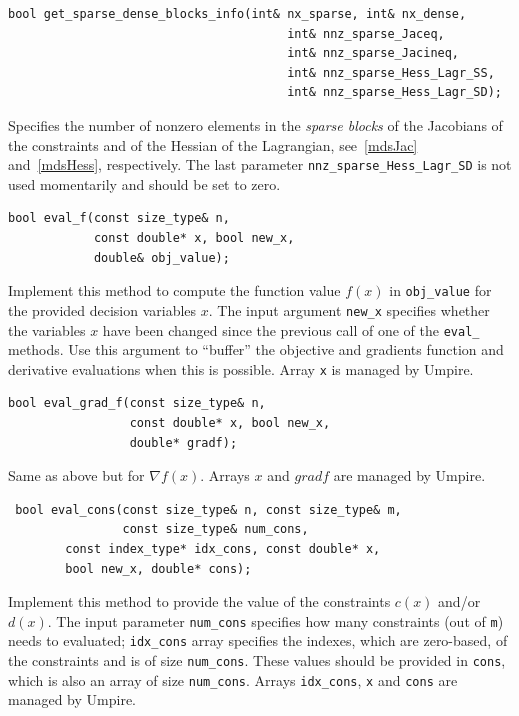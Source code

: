 \documentclass[11pt]{article}
\begin{document}
\begin{lstlisting} 
bool get_sparse_dense_blocks_info(int& nx_sparse, int& nx_dense,
					                   int& nnz_sparse_Jaceq, 
					                   int& nnz_sparse_Jacineq,
					                   int& nnz_sparse_Hess_Lagr_SS, 
					                   int& nnz_sparse_Hess_Lagr_SD);
\end{lstlisting}
\noindent Specifies the number of nonzero elements in the  \textit{sparse blocks} of the Jacobians of the constraints and of the Hessian of the Lagrangian, see~\eqref{mdsJac} and~\eqref{mdsHess}, respectively. The last parameter \texttt{nnz\_sparse\_Hess\_Lagr\_SD} is not used momentarily and should be set to zero.

\begin{lstlisting} 
bool eval_f(const size_type& n, 
            const double* x, bool new_x, 
            double& obj_value);
\end{lstlisting} 

\noindent Implement this method to compute the function value $f(x)$ in \texttt{obj\_value} for the provided decision variables $x$. The input argument \texttt{new\_x} specifies whether the variables $x$ have been changed since the previous call of one of the \texttt{eval\_} methods. Use this argument to ``buffer'' the objective and gradients function and derivative evaluations when this is possible. Array \texttt{x} is managed by Umpire.

\begin{lstlisting} 
bool eval_grad_f(const size_type& n, 
                 const double* x, bool new_x, 
                 double* gradf);
\end{lstlisting} 

\noindent Same as above but for $\nabla f(x)$. Arrays $x$ and $gradf$ are managed by Umpire.

\begin{lstlisting} 
 bool eval_cons(const size_type& n, const size_type& m, 
                const size_type& num_cons,
		const index_type* idx_cons, const double* x, 
		bool new_x, double* cons);
\end{lstlisting} 

\noindent Implement this method to provide the value of the constraints $c(x)$ and/or $d(x)$. The input parameter \texttt{num\_cons} specifies how many constraints (out of \texttt{m}) needs to evaluated; \texttt{idx\_cons} array specifies the indexes, which are zero-based, of the constraints  and is of size \texttt{num\_cons}. These values should be provided in \texttt{cons}, which is also an array of size \texttt{num\_cons}. Arrays \texttt{idx\_cons}, \texttt{x} and \texttt{cons} are managed by Umpire.
\end{document}
